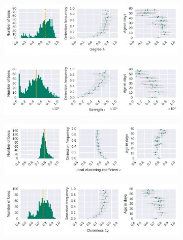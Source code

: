 \begin{figure}[!h]
	\centering
	\begin{subfigure}[b]{1.0\textwidth}
	\centering
	\includegraphics[width=1.0\textwidth]{Figures/n3-stat-degreeAgeDetF.pdf}
	\end{subfigure}
	\begin{subfigure}[b]{1.0\textwidth}
	\centering
	\includegraphics[width=1.0\textwidth]{Figures/n3-stat-strengthAgeDetF.pdf}
	\end{subfigure}
	\begin{subfigure}[b]{1.0\textwidth}
	\centering
	\includegraphics[width=1.0\textwidth]{Figures/n3-stat-lccAgeDetF.pdf}
	\end{subfigure}
	\begin{subfigure}[b]{1.0\textwidth}
	\centering
	\includegraphics[width=1.0\textwidth]{Figures/n3-stat-closenessAgeDetF.pdf}

\end{subfigure}
\end{figure}
